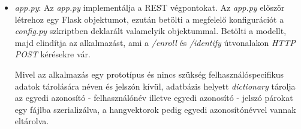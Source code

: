 \begin{itemize}
	\item \emph{app.py}: Az \emph{app.py} implementálja a REST végpontokat. Az \emph{app.py} először létrehoz egy Flask objektumot, ezután betölti a megfelelő konfigurációt a \emph{config.py} szkriptben deklarált valamelyik objektummal. Betölti a modellt, majd elindítja az alkalmazást, ami a \emph{/enroll} és \emph{/identify} útvonalakon \emph{HTTP POST} kérésekre vár.
	
	Mivel az alkalmazás egy prototípus és nincs szükség felhasználóspecifikus adatok tárolására néven és jelszón kívül, adatbázis helyett \emph{dictionary} tárolja az egyedi azonosító - felhasználónév illetve egyedi azonosító - jelszó párokat egy fájlba szerializálva, a hangvektorok pedig egyedi azonosítónévvel vannak eltárolva.
	

\end{itemize}
